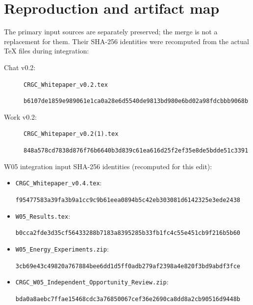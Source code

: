 \documentclass[11pt,letterpaper]{article}
\begin{document}
\clearpage
\appendix
\section{Reproduction and artifact map}
\label{app:artifacts}
The primary input sources are separately preserved; the merge is not a replacement for them. Their SHA-256 identities were recomputed from the actual TeX files during integration:
\begin{description}
\item[Chat v0.2:] \texttt{CRGC\_Whitepaper\_v0.2.tex}\par\small\texttt{b6107de1859e989061e1ca0a28e6d5540}\newline\texttt{de9813bd980e6bd02a98fdcbbb9068b}\normalsize
\item[Work v0.2:] \texttt{CRGC\_Whitepaper\_v0.2(1).tex}\par\small\texttt{848a578cd7838d876f76b6640b3d839c6}\newline\texttt{1ea616d25f2ef35e8de5bdde51c3391}\normalsize
\end{description}
\noindent W05 integration input SHA-256 identities (recomputed for this edit):
\begin{itemize}
\item \texttt{CRGC\_Whitepaper\_v0.4.tex}: \par\small\texttt{f95477583a39fa3b9a1cc9c9b61eea08}\newline\texttt{94b5c42eb303081d6142325e3ede2438}\normalsize
\item \texttt{W05\_Results.tex}: \par\small\texttt{b0cca2fde3d35cf56433288b7183a839}\newline\texttt{5285b33fb1fc4c55e451cb9f216b5b60}\normalsize
\item \texttt{W05\_Energy\_Experiments.zip}: \par\small\texttt{3cb69e43c49820a767884bee6dd1d5ff}\newline\texttt{0adb279af2398a4e820f3bd9abdf3fce}\normalsize
\item \texttt{CRGC\_W05\_Independent\_Opportunity\_Review.zip}: \par\small\texttt{bda0a8aebc7ffae15468cdc3a7685006}\newline\texttt{7cef36e2690ca8dd8a2cb90516d9448b}\normalsize
\end{itemize}
\end{document}
